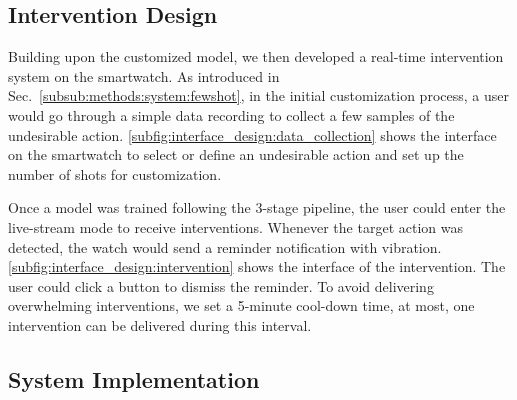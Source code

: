 \subsection{Intervention Design}
\label{sub:methods:interface}
Building upon the customized model, we then developed a real-time intervention system on the smartwatch.
As introduced in Sec.~\ref{subsub:methods:system:fewshot}, in the initial customization process, a user would go through a simple data recording to collect a few samples of the undesirable action.
\autoref{subfig:interface_design:data_collection} shows the interface on the smartwatch to select or define an undesirable action and set up the number of shots for customization.

Once a model was trained following the 3-stage pipeline, the user could enter the live-stream mode to receive interventions.
Whenever the target action was detected, the watch would send a reminder notification with vibration. \autoref{subfig:interface_design:intervention} shows the interface of the intervention.
The user could click a button to dismiss the reminder.
To avoid delivering overwhelming interventions, we set a 5-minute cool-down time, \ie at most, one intervention can be delivered during this interval.



\subsection{System Implementation}
\label{sub:methods:implementation}

